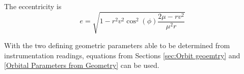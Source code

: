 \documentclass{article}
\begin{document}
\bigskip
The eccentricity is
$$e=\sqrt{1-r^2v^2\cos^2(\phi)\frac{2\mu-rv^2}{\mu^2r}}$$

With the two defining geometric parameters able to be determined from instrumentation readings, equations from Sections \ref{sec:Orbit geoemtry} and \ref{Orbital Parameters from Geometry} can be used.

\end{document}
